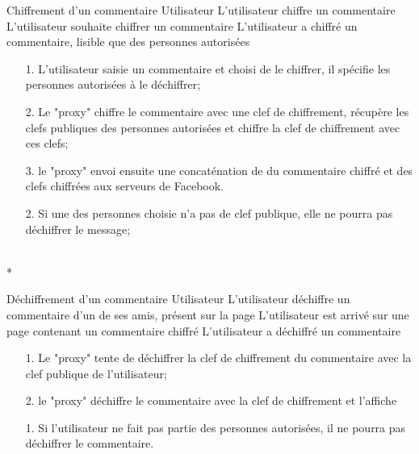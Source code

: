 \documentclass[a4paper,11pt,french]{article}
\begin{document}
\fiche
	{Chiffrement d'un commentaire}
	{Utilisateur}
	{L'utilisateur chiffre un commentaire}
	{}
	{L'utilisateur souhaite chiffrer un commentaire}
	{L'utilisateur a chiffré un commentaire, lisible que des personnes 
        autorisées}
	{\begin{itemize}
	    \item[]
	  \item[1.] L'utilisateur saisie un commentaire et choisi de le chiffrer,
          il spécifie les personnes autorisées à le déchiffrer;
	\end{itemize}
	}
	{\begin{itemize}
        \item[]
		\item[2.] Le "proxy" chiffre le commentaire avec une clef 
        de chiffrement, récupère les clefs publiques
        des personnes autorisées et chiffre la clef de chiffrement
        avec ces clefs;
		\item[3.] le "proxy" envoi ensuite une concaténation de 
        du commentaire chiffré et des clefs chiffrées aux serveurs de Facebook.
	\end{itemize}
	}
	{}
\flots
    {\begin{itemize}
    \item[]
    \item[2.] Si une des personnes choisie n'a pas de clef publique,
        elle ne pourra pas déchiffrer le message;
    \end{itemize}
    }
	{}    
\\*

\fiche
	{Déchiffrement d'un commentaire}
	{Utilisateur}
	{L'utilisateur déchiffre un commentaire d'un de ses amis, présent sur la
        page}
	{}
	{L'utilisateur est arrivé sur une page contenant un commentaire chiffré}
	{L'utilisateur a déchiffré un commentaire}
    {}
	{\begin{itemize}
        \item[]
		\item[1.] Le "proxy" tente de déchiffrer la clef de chiffrement
            du commentaire avec la clef publique de l'utilisateur;
		\item[2.] le "proxy" déchiffre le commentaire avec la clef
            de chiffrement et l'affiche
	\end{itemize}
	}
	{}
\flots
    {}
    {\begin{itemize}
    \item[]
    \item[1.] Si l'utilisateur ne fait pas partie des personnes
        autorisées, il ne pourra pas déchiffrer le commentaire.
    \end{itemize}
    }
	{}    
\end{document}
